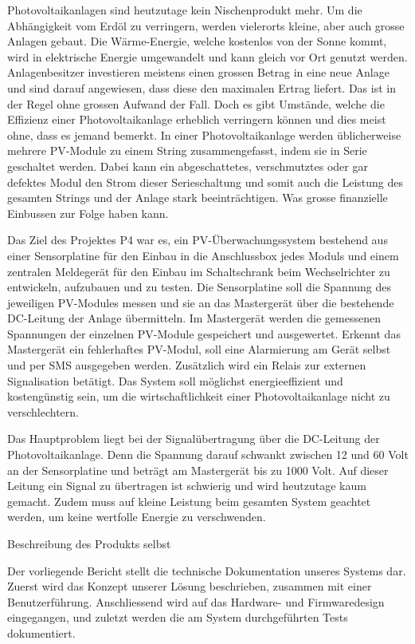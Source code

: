 Photovoltaikanlagen   sind  heutzutage   kein   Nischenprodukt  mehr. Um   die
Abhängigkeit  vom Erdöl  zu verringern,  werden vielerorts  kleine, aber  auch
grosse  Anlagen gebaut. Die  W\"arme-Energie, welche  kostenlos von  der Sonne
kommt,  wird  in elektrische  Energie  umgewandelt  und  kann gleich  vor  Ort
genutzt werden. Anlagenbesitzer  investieren meistens einen grossen  Betrag in
eine  neue  Anlage  und  sind  darauf angewiesen,  dass  diese  den  maximalen
Ertrag  liefert. Das ist  in der  Regel  ohne grossen  Aufwand der  Fall. Doch
es  gibt Umstände,  welche  die Effizienz  einer Photovoltaikanlage  erheblich
verringern  können und  dies meist  ohne, dass  es jemand  bemerkt.  In  einer
Photovoltaikanlage  werden üblicherweise  mehrere  PV-Module  zu einem  String
zusammengefasst,  indem  sie  in   Serie  geschaltet  werden. Dabei  kann  ein
abgeschattetes,  verschmutztes  oder  gar  defektes  Modul  den  Strom  dieser
Serieschaltung und somit auch die Leistung des gesamten Strings und der Anlage
stark beeinträchtigen. Was grosse finanzielle Einbussen zur Folge haben kann.

Das  Ziel des  Projektes P4  war es,  ein PV-Überwachungssystem  bestehend aus
einer Sensorplatine für den Einbau in  die Anschlussbox jedes Moduls und einem
zentralen Meldegerät  für den Einbau  im Schaltschrank beim  Wechselrichter zu
entwickeln, aufzubauen und zu testen. Die  Sensorplatine soll die Spannung des
jeweiligen PV-Modules  messen und sie  an das Mastergerät über  die bestehende
DC-Leitung  der  Anlage  übermitteln. Im  Mastergerät  werden  die  gemessenen
Spannungen der  einzelnen PV-Module  gespeichert und  ausgewertet. Erkennt das
Mastergerät ein fehlerhaftes  PV-Modul, soll eine Alarmierung  am Gerät selbst
und  per  SMS  ausgegeben  werden. Zusätzlich wird  ein  Relais  zur  externen
Signalisation  betätigt.   Das  System  soll  möglichst  energieeffizient  und
kostengünstig sein,  um die wirtschaftlichkeit einer  Photovoltaikanlage nicht
zu verschlechtern.

Das  Hauptproblem liegt  bei  der Signalübertragung  über  die DC-Leitung  der
Photovoltaikanlage. Denn die Spannung darauf schwankt  zwischen 12 und 60 Volt
an der Sensorplatine  und beträgt am Mastergerät bis zu  1000 Volt. Auf dieser
Leitung  ein Signal  zu  übertragen  ist schwierig  und  wird heutzutage  kaum
gemacht.  Zudem muss auf kleine Leistung beim gesamten System geachtet werden,
um keine wertfolle Energie zu verschwenden.

 Beschreibung des Produkts selbst

Der vorliegende  Bericht stellt  die technische Dokumentation  unseres Systems
dar.  Zuerst wird das Konzept unserer L\"osung beschrieben, zusammen mit einer
Benutzerf\"uhrung.  Anschliessend  wird auf  das Hardware-  und Firmwaredesign
eingegangen,  und   zuletzt  werden  die  am   System  durchgef\"uhrten  Tests
dokumentiert.
